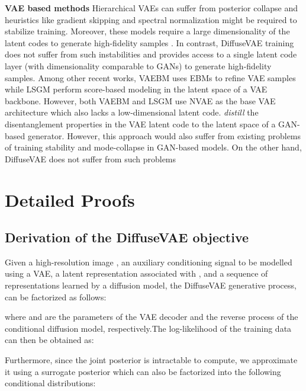 \documentclass[10pt]{article} \usepackage[accepted]{tmlr}
\begin{document}
\noindent
\textbf{VAE based methods}
Hierarchical VAEs \citep{sonderby2016ladder, vahdat2021nvae, child2021deep, razavi2019generating} can suffer from posterior collapse and heuristics like gradient skipping and spectral normalization \citep{miyato2018spectral} might be required to stabilize training. Moreover, these models require a large dimensionality of the latent codes to generate high-fidelity samples \citep{vahdat2021nvae, razavi2019generating}. In contrast, DiffuseVAE training does not suffer from such instabilities and provides access to a single latent code layer (with dimensionality comparable to GANs) to generate high-fidelity samples. Among other recent works, VAEBM \citep{xiao2021vaebm} uses EBMs \citep{du2020implicit, nijkamp2019learning} to refine VAE samples while LSGM \citep{vahdat2021nvae} perform score-based modeling in the latent space of a VAE backbone. However, both VAEBM and LSGM use NVAE \citep{vahdat2021nvae} as the base VAE architecture which also lacks a low-dimensional latent code. \citep{lee2020highfidelity} \textit{distill} the disentanglement properties in the VAE latent code to the latent space of a GAN-based generator. However, this approach would also suffer from existing problems of training stability and mode-collapse in GAN-based models. On the other hand, DiffuseVAE does not suffer from such problems
\newpage
\section{Detailed Proofs}
\label{sec:appendix_c}

\subsection{Derivation of the DiffuseVAE objective}
\label{subsec:appendix_c_1}
Given a high-resolution image , an auxiliary conditioning signal  to be modelled using a VAE, a latent representation  associated with , and a sequence of  representations  learned by a diffusion model, the DiffuseVAE generative process,  can be factorized as follows:


where  and  are the parameters of the VAE decoder and the reverse process of the conditional diffusion model, respectively.The log-likelihood of the training data can then be obtained as:

Furthermore, since the joint posterior  is intractable to compute, we approximate it using a surrogate posterior  which can also be factorized into the following conditional distributions:
\end{document}
